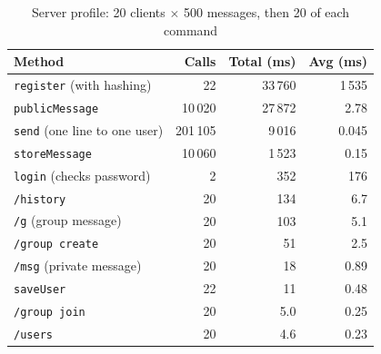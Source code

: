 \documentclass[conference]{IEEEtran}
\newcommand{\code}[1]{\texttt{#1}}
\begin{document}
\begin{table}[!t]
\caption{Server profile: 20 clients $\times$ 500 messages, then 20 of each command}
\label{tab:prof}
\centering\footnotesize
\begin{tabular}{@{}p{}rrr@{}}
\toprule
Method & Calls & Total (ms) & Avg (ms)\\
\midrule
\code{register} (with hashing) & 22 & 33\,760 & 1\,535\\
\code{publicMessage} & 10\,020 & 27\,872 & 2.78\\
\code{send} (one line to one user) & 201\,105 & 9\,016 & 0.045\\
\code{storeMessage} & 10\,060 & 1\,523 & 0.15\\
\code{login} (checks password) & 2 & 352 & 176\\
\code{/history} & 20 & 134 & 6.7\\
\code{/g} (group message) & 20 & 103 & 5.1\\
\code{/group create} & 20 & 51 & 2.5\\
\code{/msg} (private message) & 20 & 18 & 0.89\\
\code{saveUser} & 22 & 11 & 0.48\\
\code{/group join} & 20 & 5.0 & 0.25\\
\code{/users} & 20 & 4.6 & 0.23\\
\bottomrule
\end{tabular}
\end{table}
\end{document}

